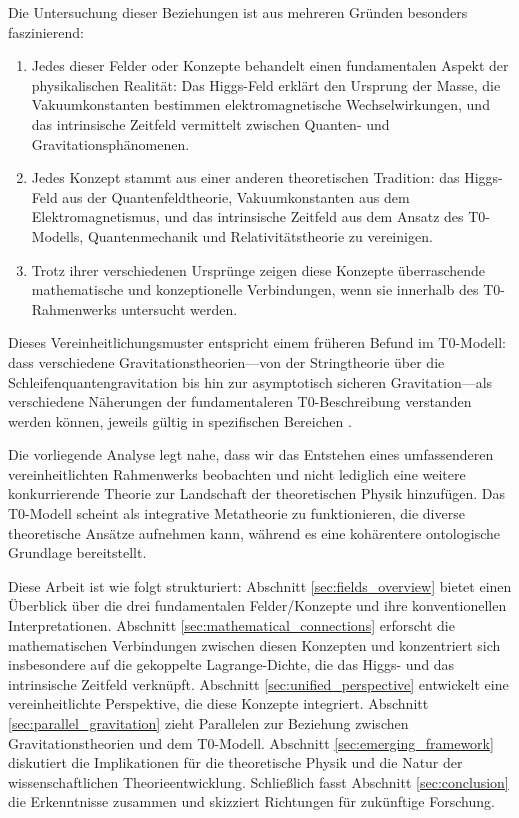 \documentclass[12pt,a4paper]{article}
\begin{document}
	Die Untersuchung dieser Beziehungen ist aus mehreren Gründen besonders faszinierend:
	
	\begin{enumerate}
		\item Jedes dieser Felder oder Konzepte behandelt einen fundamentalen Aspekt der physikalischen Realität: Das Higgs-Feld erklärt den Ursprung der Masse, die Vakuumkonstanten bestimmen elektromagnetische Wechselwirkungen, und das intrinsische Zeitfeld vermittelt zwischen Quanten- und Gravitationsphänomenen.
		
		\item Jedes Konzept stammt aus einer anderen theoretischen Tradition: das Higgs-Feld aus der Quantenfeldtheorie, Vakuumkonstanten aus dem Elektromagnetismus, und das intrinsische Zeitfeld aus dem Ansatz des T0-Modells, Quantenmechanik und Relativitätstheorie zu vereinigen.
		
		\item Trotz ihrer verschiedenen Ursprünge zeigen diese Konzepte überraschende mathematische und konzeptionelle Verbindungen, wenn sie innerhalb des T0-Rahmenwerks untersucht werden.
	\end{enumerate}
	
	Dieses Vereinheitlichungsmuster entspricht einem früheren Befund im T0-Modell: dass verschiedene Gravitationstheorien—von der Stringtheorie über die Schleifenquantengravitation bis hin zur asymptotisch sicheren Gravitation—als verschiedene Näherungen der fundamentaleren T0-Beschreibung verstanden werden können, jeweils gültig in spezifischen Bereichen \cite{pascher_completetheory_2025}.
	
	Die vorliegende Analyse legt nahe, dass wir das Entstehen eines umfassenderen vereinheitlichten Rahmenwerks beobachten und nicht lediglich eine weitere konkurrierende Theorie zur Landschaft der theoretischen Physik hinzufügen. Das T0-Modell scheint als integrative Metatheorie zu funktionieren, die diverse theoretische Ansätze aufnehmen kann, während es eine kohärentere ontologische Grundlage bereitstellt.
	
	Diese Arbeit ist wie folgt strukturiert: Abschnitt \ref{sec:fields_overview} bietet einen Überblick über die drei fundamentalen Felder/Konzepte und ihre konventionellen Interpretationen. Abschnitt \ref{sec:mathematical_connections} erforscht die mathematischen Verbindungen zwischen diesen Konzepten und konzentriert sich insbesondere auf die gekoppelte Lagrange-Dichte, die das Higgs- und das intrinsische Zeitfeld verknüpft. Abschnitt \ref{sec:unified_perspective} entwickelt eine vereinheitlichte Perspektive, die diese Konzepte integriert. Abschnitt \ref{sec:parallel_gravitation} zieht Parallelen zur Beziehung zwischen Gravitationstheorien und dem T0-Modell. Abschnitt \ref{sec:emerging_framework} diskutiert die Implikationen für die theoretische Physik und die Natur der wissenschaftlichen Theorieentwicklung. Schließlich fasst Abschnitt \ref{sec:conclusion} die Erkenntnisse zusammen und skizziert Richtungen für zukünftige Forschung.
	
\end{document}
